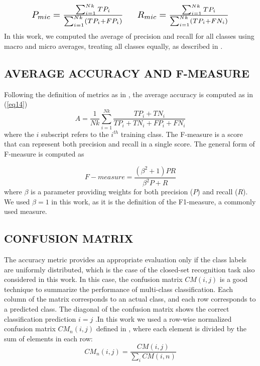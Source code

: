 \documentclass{ieeeaccess}
\begin{document}
\begin{equation}
\begin{matrix}
\resizebox{0.38\hsize}{!}{$ P_{mic}=\frac{\sum_{i=1}^{Nk}TP_{i}}{\sum_{i=1}^{Nk}(TP_{i}+FP_{i})} $}
&   &
\resizebox{0.38\hsize}{!}{$R_{mic}=\frac{\sum_{i=1}^{Nk}TP_{i}}{\sum_{i=1}^{Nk}(TP_{i}+FN_{i})} $}
\end{matrix}
\label{eq13}
\end{equation}
In this work, we computed the average of precision and recall for all classes using macro and micro averages, treating all classes equally, as described in \cite{30}.

\subsection{AVERAGE ACCURACY AND F-MEASURE}
Following the definition of metrics as in \cite{31}, the average accuracy is computed as in (\ref{eq14})
\begin{equation}
A=\frac{1}{Nk}\sum_{i=1}^{Nk}\frac{TP_{i}+TN_{i}}{TP_{i}+TN_{i}+FP_{i}+FN_{i}}
\label{eq14}
\end{equation}
where the $i$ subscript refers to the $ i^{th} $ training class. The F-measure is a score that can represent both precision and recall in a single score. The general form of F-measure is computed as 

\begin{equation}
F-measure=\frac{(\beta^{2}+1)PR}{\beta^{2}P+R}
\label{eq15}
\end{equation}
where $ \beta $ is a parameter providing weights for both precision ($P$) and recall ($R$). We used $\beta=1$ in this work, as it is the definition of the F1-measure, a commonly used measure.

\subsection{CONFUSION MATRIX}
The accuracy metric provides an appropriate evaluation only if the class labels are uniformly distributed, which is the case of the closed-set recognition task also considered in this work. In this case, the confusion matrix $ CM(i,j) $ is a good technique to summarize the performance of multi-class classification. Each column of the matrix corresponds to an actual class, and each row corresponds to a predicted class. The diagonal of the confusion matrix shows the correct classification prediction $ i=j $ .In this work we used a row-wise normalized confusion matrix  $ CM_{n}(i,j) $ defined in \cite{32}, where each element is divided by the sum of elements in each row:
\begin{equation}
CM_{n}(i,j)=\frac{CM(i,j)}{\sum_{i}CM(i,n)}
\label{eq16}
\end{equation}
\end{document}
